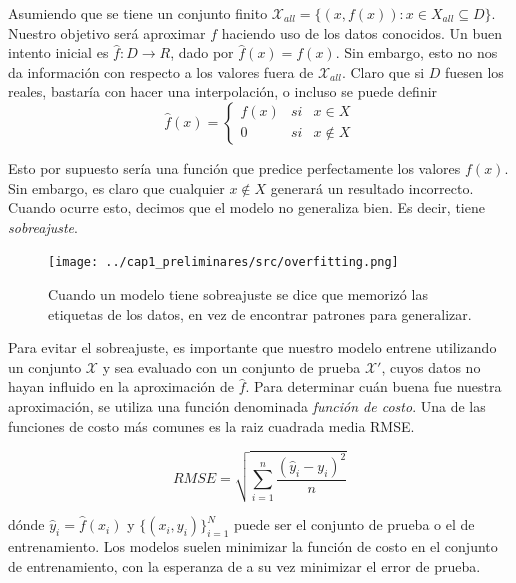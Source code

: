     Asumiendo que se tiene un conjunto finito $ \mathcal X_{all} =  \{(x,f(x)): x\in  X_{all} \subseteq D\}$. Nuestro objetivo será aproximar $f$ haciendo uso de los datos conocidos. Un buen intento inicial es $\hat f: D \to R$, dado por $\hat f(x) = f(x)$. Sin embargo, esto no nos da información con respecto a los valores fuera de $\mathcal X_{all}$. Claro que si $D$ fuesen los reales, bastaría con hacer una interpolación, o incluso se puede definir 
    \begin{equation}
        \hat f(x) = \left\{ 
            \begin{matrix}
                f(x) & si & x \in X \\
                0 & si & x \notin X
            \end{matrix}  \right.
    \end{equation}

    Esto por supuesto sería una función que predice perfectamente los valores $f(x)$. Sin embargo, es claro que cualquier $x\notin X$ generará un resultado incorrecto. Cuando ocurre esto, decimos que el modelo no generaliza bien. Es decir, tiene \textsl{sobreajuste}.

    \begin{figure}[H]
        \centering
        \texttt{[image: ../cap1\_preliminares/src/overfitting.png]}
        \caption{Cuando un modelo tiene sobreajuste se dice que memorizó las etiquetas de los datos, en vez de encontrar patrones para generalizar.}
    \end{figure}

    Para evitar el sobreajuste, es importante que nuestro modelo entrene utilizando un conjunto $\mathcal X$ y sea evaluado con un conjunto de prueba $\mathcal X'$, cuyos datos no hayan influido en la aproximación de $\hat f$. Para determinar cuán buena fue nuestra aproximación, se utiliza una función denominada \textsl{función de costo}. Una de las funciones de costo más comunes es la raiz cuadrada media RMSE.

    \begin{equation}
        RMSE = \sqrt{\sum_{i=1}^n\frac{(\hat y_i - y_i)^2}{n}}
    \end{equation}
    
    dónde $\hat y_i = \hat f(x_i)$ y $\{(x_i, y_i)\}_{i=1}^N$ puede ser el conjunto de prueba o el de entrenamiento. Los modelos suelen minimizar la función de costo en el conjunto de entrenamiento, con la esperanza de a su vez minimizar el error de prueba.

